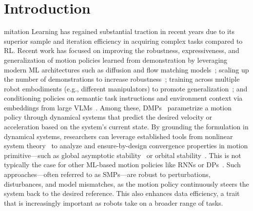 \section{Introduction}
mitation Learning \citep{schaal1999imitation, zare2024survey} has regained substantial traction in recent years due to its superior sample and iteration efficiency in acquiring complex tasks compared to \gls{RL}. Recent work has focused on improving the robustness, expressiveness, and generalization of motion policies learned from demonstration by leveraging modern \gls{ML} architectures such as diffusion and flow matching models~\citep{chi2023diffusion, black2024pi0}; scaling up the number of demonstrations to increase robustness~\citep{o2024open, black2024pi0, gemini2025robotics}; training across multiple robot embodiments (e.g., different manipulators) to promote generalization~\citep{o2024open, black2024pi0}; and conditioning policies on semantic task instructions and environment context via embeddings from large \glspl{VLM}~\citep{black2024pi0, gemini2025robotics}.
Among these, \glspl{DMP}~\citep{ijspeert2002learning, ijspeert2013dynamical, saveriano2023dynamic, hu2024fusion} parametrize a motion policy through dynamical systems that predict the desired velocity or acceleration based on the system’s current state. By grounding the formulation in dynamical systems, researchers can leverage established tools from nonlinear system theory~\citep{khalil2002nonlinear} to analyze and ensure-by-design convergence properties in motion primitive—such as global asymptotic stability~\citep{kober2009learning, ijspeert2013dynamical, rana2020euclideanizing, urain2020imitationflow, zhang2022learning, perez2023stable, perez2024puma} or orbital stability~\citep{ijspeert2002learning, kober2009learning, wensing2017sparse, urain2020imitationflow, khadivar2021learning, abu2021periodic, abu2024learning, zhi2024teaching, nah2025combining}. This is not typically the case for other ML-based motion policies like \glspl{RNN} or \glspl{DP}~\citep{chi2023diffusion, o2024open, black2024pi0, gemini2025robotics}.
Such approaches—often referred to as \glspl{SMP}—are robust to perturbations, disturbances, and model mismatches, as the motion policy continuously steers the system back to the desired reference. This also enhances data efficiency, a trait that is increasingly important as robots take on a broader range of tasks.

